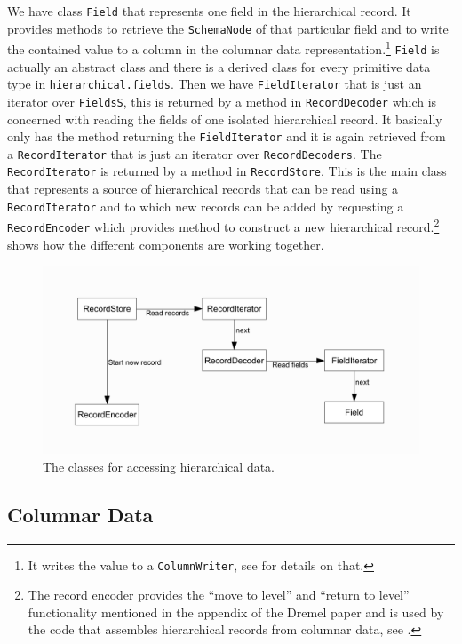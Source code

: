 We have class \texttt{Field} that represents one field in the hierarchical
record. It provides methods to retrieve the \texttt{SchemaNode} of that
particular field and to write the contained value to a column in
the columnar data representation.\footnote{It writes the value to a
\texttt{ColumnWriter}, see  for details on that.} \texttt{Field}
is actually an abstract class and there is a derived class for every
primitive data type in \texttt{hierarchical.fields}.
Then we have \texttt{FieldIterator} that is just an iterator over
\texttt{FieldsS}, this is returned by a method in \texttt{RecordDecoder}
which is concerned with reading the fields of one isolated hierarchical record.
It basically only has the method returning the \texttt{FieldIterator}
and it is again retrieved from a \texttt{RecordIterator} that is just
an iterator over \texttt{RecordDecoders}. The \texttt{RecordIterator}
is returned by a method in \texttt{RecordStore}. This is the main class
that represents a source of hierarchical records that can be read using
a \texttt{RecordIterator} and to which new records can be added by requesting
a \texttt{RecordEncoder} which provides method to construct a new hierarchical
record.\footnote{The record encoder provides the ``move to level'' and
``return to level'' functionality mentioned in the appendix of the Dremel
paper \cite{melnik2010dremel} and is used by the code that assembles
hierarchical records from columnar data, see .}
 shows how the different components are working together.

\begin{figure}[ht]
  \centering
  \includegraphics[width=.8\textwidth]{images/hierarchical}
  \caption{The classes for accessing hierarchical data.}
  \label{fig:hierarchical}
\end{figure}



\subsection{Columnar Data}
\label{sec:columnar}

